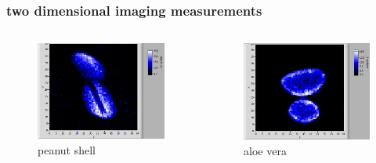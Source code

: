 \documentclass[aspectratio=169]{beamer}
\begin{document}
\begin{frame}
\frametitle{two dimensional imaging measurements}
\begin{columns}
\begin{figure}
\includegraphics[width=.80 \linewidth]{./Resources/Teil_3/peanut_shell.JPG}
\caption{peanut shell}
\end{figure}

\begin{figure}
\includegraphics[width=0.8 \linewidth]{./Resources/Teil_3/aloevera_2d.JPG}
\caption{aloe vera}
\end{figure}

\end{columns}
\end{frame}
\end{document}
